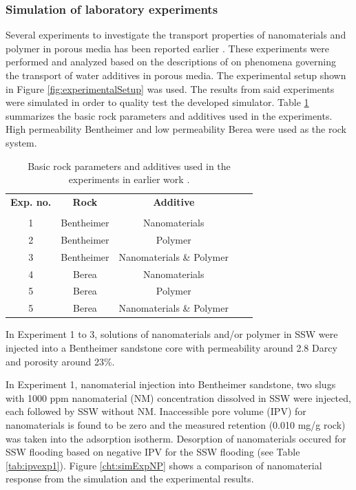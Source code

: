 \documentclass[nanomaterials,article,submit,moreauthors,pdftex]{Definitions/mdpi}
\begin{document}
\subsubsection{Simulation of laboratory experiments}
Several experiments to investigate the transport properties of nanomaterials and polymer in porous media has been reported earlier \cite{Najafiazar2016, Najafiazar2016a}. These experiments were performed and analyzed based on the descriptions of \citet{Lotsch1985} on phenomena governing the transport of water additives in porous media. The experimental setup shown in Figure \ref{fig:experimentalSetup} was used. The results from said experiments were simulated in order to quality test the developed simulator. Table \ref{tab:rockParams} summarizes the basic rock parameters and additives used in the experiments. High permeability Bentheimer and low permeability Berea were used as the rock system. 

\begin{table}[h!]
\small
\centering
\caption{Basic rock parameters and additives used in the experiments in earlier work \cite{Najafiazar2016}.}
\label{tab:rockParams}
\begin{tabular}{c c c c l } 
\toprule
\textbf{Exp. no.} & \textbf{Rock}  & \textbf{Additive} \\ 
& & \\
\midrule 
1   & Bentheimer & Nanomaterials\\
2   & Bentheimer & Polymer \\ 
3   & Bentheimer & Nanomaterials \& Polymer \\ 
4   & Berea        & Nanomaterials\\
5   & Berea        & Polymer \\ 
5   & Berea        & Nanomaterials \& Polymer \\ 
\bottomrule
\end{tabular}
\end{table}

In Experiment 1 to 3, solutions of nanomaterials and/or polymer in SSW were injected into a Bentheimer sandstone core with permeability around 2.8 Darcy and porosity around 23\%.

In Experiment 1, nanomaterial injection into Bentheimer sandstone, two slugs with 1000 ppm nanomaterial (NM) concentration dissolved in SSW were injected, each followed by SSW without NM. Inaccessible pore volume (IPV) for nanomaterials is found to be zero and the measured retention (0.010 mg/g rock) was taken into the adsorption isotherm. Desorption of nanomaterials occured for SSW flooding based on negative IPV for the SSW flooding (see Table \ref{tab:ipvexp1}). Figure \ref{cht:simExpNP} shows a comparison of nanomaterial response from the simulation and the experimental results.
\end{document}
